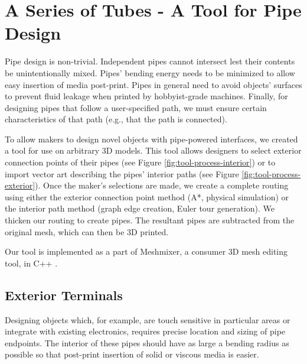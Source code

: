 \section{A Series of Tubes - A Tool for Pipe Design} 

Pipe design is non-trivial.  Independent pipes cannot intersect lest their contents be unintentionally mixed.  Pipes' bending energy needs to be minimized to allow easy insertion of media post-print.  Pipes in general need to avoid objects' surfaces to prevent fluid leakage when printed by hobbyist-grade machines.  Finally, for designing pipes that follow a user-specified path, we must ensure certain characteristics of that path (e.g., that the path is connected). 

To allow makers to design novel objects with pipe-powered interfaces, we created a tool for use on arbitrary 3D models.  This tool allows designers to select exterior connection points of their pipes (see Figure \ref{fig:tool-process-interior}) or to import vector art describing the pipes' interior paths (see Figure \ref{fig:tool-process-exterior}).  Once the maker's selections are made, we create a complete routing using either the exterior connection point method (A*, physical simulation) or the interior path method (graph edge creation, Euler tour generation).  We thicken our routing to create pipes.  The resultant pipes are subtracted from the original mesh, which can then be 3D printed.

Our tool is implemented as a part of Meshmixer, a consumer 3D mesh editing tool, in C++ \cite{Schmidt-meshmixer}.

\subsection{Exterior Terminals}

Designing objects which, for example, are touch sensitive in particular areas or integrate with existing electronics, requires precise location and sizing of pipe endpoints.  The interior of these pipes should have as large a bending radius as possible so that post-print insertion of solid or viscous media is easier.

